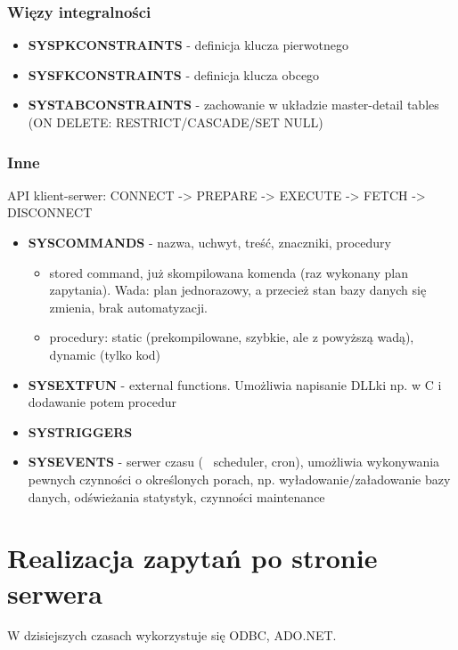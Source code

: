 \documentclass[a4paper,twoside]{article}
\begin{document}
  	\section*{Więzy integralności}
  	\begin{itemize}
  		\item \textbf{SYSPKCONSTRAINTS} - definicja klucza pierwotnego
  		\item \textbf{SYSFKCONSTRAINTS} - definicja klucza obcego
  		\item \textbf{SYSTABCONSTRAINTS} - zachowanie w układzie master-detail tables (ON DELETE: RESTRICT/CASCADE/SET NULL)
  	\end{itemize}
 	\section*{Inne}
  	API klient-serwer: CONNECT -> PREPARE -> EXECUTE -> FETCH -> DISCONNECT
  	\begin{itemize}
	  	\item \textbf{SYSCOMMANDS} - nazwa, uchwyt, treść, znaczniki, procedury
	  	\begin{itemize}
	  		\item stored command, już skompilowana komenda (raz wykonany plan zapytania). Wada: plan jednorazowy, a przecież stan bazy danych się zmienia, brak automatyzacji.
	  		\item procedury: static (prekompilowane, szybkie, ale z powyższą wadą), dynamic (tylko kod)
	  	\end{itemize}
	  	\item \textbf{SYSEXTFUN} - external functions. Umożliwia napisanie DLLki np. w C i dodawanie potem procedur
	  	\item \textbf{SYSTRIGGERS}
	  	\item \textbf{SYSEVENTS} - serwer czasu (~ scheduler, cron), umożliwia wykonywania pewnych czynności o określonych porach, np. wyładowanie/załadowanie bazy danych, odświeżania statystyk, czynności maintenance
  	\end{itemize}
  	
  	\part*{Realizacja zapytań po stronie serwera}
  	W dzisiejszych czasach wykorzystuje się ODBC, ADO.NET.
\end{document}
